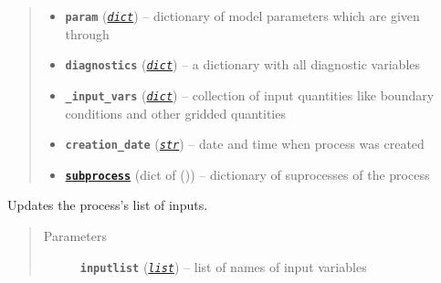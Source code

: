 \documentclass[a4paper,10pt,english]{sphinxmanual}
\begin{document}
\begin{fulllineitems}
\begin{quote}
\begin{description}
\begin{itemize}
\item {} 
\textbf{\texttt{param}} (\href{http://docs.python.org/2.7/library/stdtypes.html\#dict}{\emph{\texttt{dict}}}) -- dictionary of model parameters which are given
through 

\item {} 
\textbf{\texttt{diagnostics}} (\href{http://docs.python.org/2.7/library/stdtypes.html\#dict}{\emph{\texttt{dict}}}) -- a dictionary with all diagnostic variables

\item {} 
\textbf{\texttt{\_input\_vars}} (\href{http://docs.python.org/2.7/library/stdtypes.html\#dict}{\emph{\texttt{dict}}}) -- collection of input quantities like boundary conditions
and other gridded quantities

\item {} 
\textbf{\texttt{creation\_date}} (\href{http://docs.python.org/2.7/library/functions.html\#str}{\emph{\texttt{str}}}) -- date and time when process was created

\item {} 
\href{http://docs.python.org/2.7/library/subprocess.html\#module-subprocess}{\textbf{\texttt{subprocess}}} (dict of {\hyperref[api/climlab.process:climlab.process.process.Process]{\emph{}}} ()) -- dictionary of suprocesses of the process

\end{itemize}

\end{description}\end{quote}

\begin{fulllineitems}
\label{api/climlab.process:climlab.process.process.Process.add_input}
Updates the process's list of inputs.
\begin{quote}\begin{description}
\item[{Parameters}] \leavevmode
\textbf{\texttt{inputlist}} (\href{http://docs.python.org/2.7/library/functions.html\#list}{\emph{\texttt{list}}}) -- list of names of input variables

\end{description}\end{quote}

\end{fulllineitems}


\end{fulllineitems}
\end{document}
